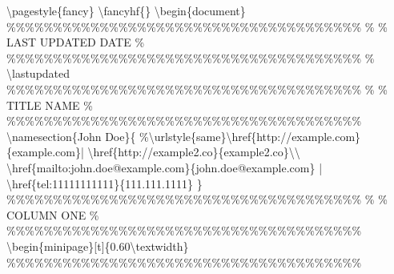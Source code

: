 \documentclass{article}%
\begin{document}
\newline%
\textbackslash{}pagestyle\{fancy\}\newline%
\textbackslash{}fancyhf\{\}\newline%
\newline%
\textbackslash{}begin\{document\}\newline%
\newline%
\%\%\%\%\%\%\%\%\%\%\%\%\%\%\%\%\%\%\%\%\%\%\%\%\%\%\%\%\%\%\%\%\%\%\%\%\%\%\newline%
\%\newline%
\%     LAST UPDATED DATE\newline%
\%\newline%
\%\%\%\%\%\%\%\%\%\%\%\%\%\%\%\%\%\%\%\%\%\%\%\%\%\%\%\%\%\%\%\%\%\%\%\%\%\%\newline%
\% \textbackslash{}lastupdated\newline%
\newline%
\%\%\%\%\%\%\%\%\%\%\%\%\%\%\%\%\%\%\%\%\%\%\%\%\%\%\%\%\%\%\%\%\%\%\%\%\%\%\newline%
\%\newline%
\%     TITLE NAME\newline%
\%\newline%
\%\%\%\%\%\%\%\%\%\%\%\%\%\%\%\%\%\%\%\%\%\%\%\%\%\%\%\%\%\%\%\%\%\%\%\%\%\%\newline%
\textbackslash{}namesection\{John Doe\}\{ \%\textbackslash{}urlstyle\{same\}\textbackslash{}href\{http://example.com\}\{example.com\}| \textbackslash{}href\{http://example2.co\}\{example2.co\}\textbackslash{}\textbackslash{}\newline%
\textbackslash{}href\{mailto:john.doe@example.com\}\{john.doe@example.com\} | \textbackslash{}href\{tel:11111111111\}\{111.111.1111\}\newline%
\}\newline%
\newline%
\%\%\%\%\%\%\%\%\%\%\%\%\%\%\%\%\%\%\%\%\%\%\%\%\%\%\%\%\%\%\%\%\%\%\%\%\%\%\newline%
\%\newline%
\%     COLUMN ONE\newline%
\%\newline%
\%\%\%\%\%\%\%\%\%\%\%\%\%\%\%\%\%\%\%\%\%\%\%\%\%\%\%\%\%\%\%\%\%\%\%\%\%\%\newline%
\newline%
\textbackslash{}begin\{minipage\}{[}t{]}\{0.60\textbackslash{}textwidth\}\newline%
\newline%
\%\%\%\%\%\%\%\%\%\%\%\%\%\%\%\%\%\%\%\%\%\%\%\%\%\%\%\%\%\%\%\%\%\%\%\%\%\%\newline%
\end{document}
